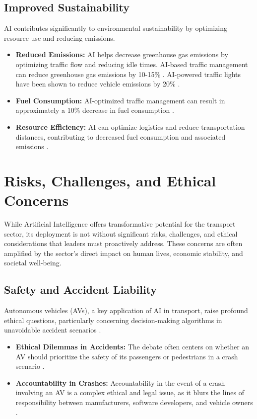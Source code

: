 \subsection{Improved Sustainability}
AI contributes significantly to environmental sustainability by optimizing resource use and reducing emissions.
\begin{itemize}
    \item \textbf{Reduced Emissions:} AI helps decrease greenhouse gas emissions by optimizing traffic flow and reducing idle times. AI-based traffic management can reduce greenhouse gas emissions by 10-15\% \cite{Medium_Benefits}. AI-powered traffic lights have been shown to reduce vehicle emissions by 20\% \cite{TLIMagazine_Benefits}.
    \item \textbf{Fuel Consumption:} AI-optimized traffic management can result in approximately a 10\% decrease in fuel consumption \cite{SustainabilityLinkedIn_Benefits}.
    \item \textbf{Resource Efficiency:} AI can optimize logistics and reduce transportation distances, contributing to decreased fuel consumption and associated emissions \cite{SustainabilityDirectory_Benefits}.
\end{itemize}

\section{Risks, Challenges, and Ethical Concerns}

While Artificial Intelligence offers transformative potential for the transport sector, its deployment is not without significant risks, challenges, and ethical considerations that leaders must proactively address. These concerns are often amplified by the sector's direct impact on human lives, economic stability, and societal well-being.

\subsection{Safety and Accident Liability}
Autonomous vehicles (AVs), a key application of AI in transport, raise profound ethical questions, particularly concerning decision-making algorithms in unavoidable accident scenarios \cite{Numalis_Risks}.
\begin{itemize}
    \item \textbf{Ethical Dilemmas in Accidents:} The debate often centers on whether an AV should prioritize the safety of its passengers or pedestrians in a crash scenario \cite{Numalis_Risks}.
    \item \textbf{Accountability in Crashes:} Accountability in the event of a crash involving an AV is a complex ethical and legal issue, as it blurs the lines of responsibility between manufacturers, software developers, and vehicle owners \cite{Repec_Risks, FPGInsights_Risks}.
\end{itemize}

